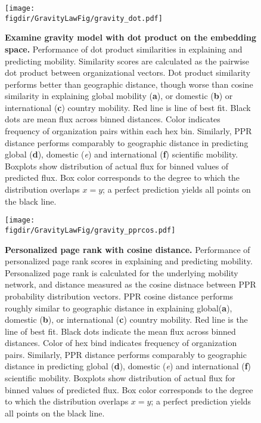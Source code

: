 \documentclass[12pt]{article} %
\def\figdir{../Figs}
\begin{document}
%
%
\begin{figure}[p!]
	\centering
	\texttt{[image: \\figdir/GravityLawFig/gravity\_dot.pdf]}
	\caption{
		\textbf{Examine gravity model with dot product on the embedding space.}
		Performance of dot product similarities in explaining and predicting mobility.
		Similarity scores are calculated as the pairwise dot product between organizational vectors.
		Dot product similarity performs better than geographic distance, though worse than cosine similarity in explaining global mobility (\textbf{a}), or domestic (\textbf{b}) or international (\textbf{c}) country mobility.
		Red line is line of best fit.
		Black dots are mean flux across binned distances.
		Color indicates frequency of organization pairs within each hex bin.
		Similarly, PPR distance performs comparably to geographic distance in predicting global (\textbf{d}), domestic (\textit{e}) and international (\textbf{f}) scientific mobility.
		Boxplots show distribution of actual flux for binned values of predicted flux.
		Box color corresponds to the degree to which the distribution overlaps $x = y$;
		a perfect prediction yields all points on the black line.
	}
	\label{fig:supp:gravity_dot}
\end{figure}




%
%
\begin{figure}[p!]
	\centering
	\texttt{[image: \\figdir/GravityLawFig/gravity\_pprcos.pdf]}
	\caption{
		\textbf{Personalized page rank with cosine distance.}
		Performance of personalized page rank scores in explaining and predicting mobility.
		Personalized page rank is calculated for the underlying mobility network, and distance measured as the cosine distnace between PPR probability distribution vectors.
		PPR cosine distance performs roughly similar to geographic distance in explaining global(\textbf{a}), domestic (\textbf{b}), or international (\textbf{c}) country mobility.
		Red line is the line of best fit.
		Black dots indicate the mean flux across binned distances.
		Color of hex bind indicates frequency of organization pairs.
		Similarly, PPR distance performs comparably to geographic distance in predicting global (\textbf{d}), domestic (\textit{e}) and international (\textbf{f}) scientific mobility.
		Boxplots show distribution of actual flux for binned values of predicted flux.
		Box color corresponds to the degree to which the distribution overlaps $x = y$;
		a perfect prediction yields all points on the black line.
	}
	\label{fig:supp:gravity_pprcos}
\end{figure}
\end{document}

